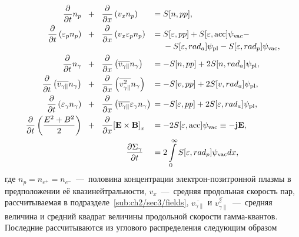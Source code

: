 \begin{align}
    \label{eq:ch2/hd_p1}
    \frac{\partial }{\partial t}n_p  \quad &\!+\!& &\frac{\partial}{\partial x}\left( v_x n_p \right) \!\!\!&\!&\!=  S[n, pp] ,\\
    \label{eq:ch2/hd_p2}
    \frac{\partial}{\partial t}\left( \varepsilon_p n_p \right)   \quad &\!+\!& & \frac{\partial}{\partial x}\left( v_x \varepsilon_p n_p \right) \!\!\!&\!&\!=
    \begin{aligned}[t]
        & S[\varepsilon, pp] + S[\varepsilon, \mathrm{acc}] \psi_\mathrm{vac} - \\
        & - S[\varepsilon, rad_a] \psi_\mathrm{pl} - S[\varepsilon, rad_p] \psi_\mathrm{vac} ,
    \end{aligned} \\
    \label{eq:ch2/hd_g1}
    \frac{\partial }{\partial t}n_\gamma  \quad &\!+\!& &\frac{\partial}{\partial x}\left( \overline{v_{\gamma\parallel}} n_\gamma \right)\!\!\!&\!&\!= -S[n, pp] + 2 S[n, rad_a] \psi_\mathrm{pl} ,\\
    \label{eq:ch2/hd_g2}
    \frac{\partial}{\partial t}\left( \overline{v_{\gamma\parallel}} n_\gamma \right) \quad &\!+\!& & \frac{\partial}{\partial x}\left( \overline{v_{\gamma\parallel}^2} n_\gamma \right) \!\!\!&\!&\!=  -S[v, pp] + 2 S[v, rad_a] \psi_\mathrm{pl} ,\\
    \label{eq:ch2/hd_g3}
    \frac{\partial}{\partial t}\left( \varepsilon_\gamma n_\gamma \right) \quad &\!+\!& &\frac{\partial}{\partial x}\left( \overline{v_{\gamma\parallel}} \varepsilon_\gamma n_\gamma \right) \!\!\!&\!&\!= -S[\varepsilon, pp] + 2 S[\varepsilon, rad_a] \psi_\mathrm{pl} ,\\
    \label{eq:ch2/hd_e1}
    \frac{\partial }{\partial t}\left( \frac{E^2 + B^2}{2} \right) \quad &\!+\!& &\frac{\partial}{\partial x} {\left[ \vb{E\times B} \right]}_x \!\!\!&\!&\!= - 2 S[\varepsilon, \mathrm{acc}]\psi_\mathrm{vac} \equiv - \vb{jE} ,\\
    && & \qquad\quad \frac{\partial \Sigma_\gamma}{\partial t} \!\!\!&\!&\!= 2 \int\limits_0^\infty S[\varepsilon, rad_p]\psi_\mathrm{vac} dx ,
\end{align}
где $n_p = n_{e^+} = n_{e^-}$~---~половина концентрации электрон-позитронной плазмы в предположении её квазинейтральности, $v_x$~---~средняя продольная скорость пар, рассчитываемая в подразделе~\ref{sub:ch2/sec3/fields}, $\overline{v_{\gamma\parallel}}$ и $\overline{v_{\gamma\parallel}^2}$~---~средняя величина и средний квадрат величины продольной скорости гамма-квантов.
Последние рассчитываются из углового распределения следующим образом
